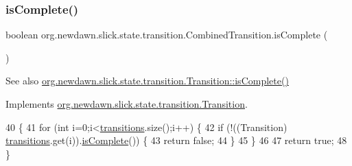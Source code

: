 \subsubsection{\texorpdfstring{is\+Complete()}{isComplete()}}
{\footnotesize\ttfamily boolean org.\+newdawn.\+slick.\+state.\+transition.\+Combined\+Transition.\+is\+Complete (\begin{DoxyParamCaption}{ }\end{DoxyParamCaption})\hspace{0.3cm}{\ttfamily [inline]}}

\begin{DoxySeeAlso}{See also}
\mbox{\hyperlink{interfaceorg_1_1newdawn_1_1slick_1_1state_1_1transition_1_1_transition_af397d5185cf09c30c3f51d5021d63815}{org.\+newdawn.\+slick.\+state.\+transition.\+Transition\+::is\+Complete()}} 
\end{DoxySeeAlso}


Implements \mbox{\hyperlink{interfaceorg_1_1newdawn_1_1slick_1_1state_1_1transition_1_1_transition_af397d5185cf09c30c3f51d5021d63815}{org.\+newdawn.\+slick.\+state.\+transition.\+Transition}}.


\begin{DoxyCode}
40                                 \{
41         \textcolor{keywordflow}{for} (\textcolor{keywordtype}{int} i=0;i<\mbox{\hyperlink{classorg_1_1newdawn_1_1slick_1_1state_1_1transition_1_1_combined_transition_a4fea111ea283a26351cb164e389ebbbf}{transitions}}.size();i++) \{
42             \textcolor{keywordflow}{if} (!((Transition) \mbox{\hyperlink{classorg_1_1newdawn_1_1slick_1_1state_1_1transition_1_1_combined_transition_a4fea111ea283a26351cb164e389ebbbf}{transitions}}.get(i)).\mbox{\hyperlink{classorg_1_1newdawn_1_1slick_1_1state_1_1transition_1_1_combined_transition_a8c5e343409337ff699285e29ca8ec457}{isComplete}}()) \{
43                 \textcolor{keywordflow}{return} \textcolor{keyword}{false};
44             \}
45         \}
46         
47         \textcolor{keywordflow}{return} \textcolor{keyword}{true};
48     \}
\end{DoxyCode}
\mbox{\label{classorg_1_1newdawn_1_1slick_1_1state_1_1transition_1_1_combined_transition_a31b265b22a85d140c70135142e499a81}} 
